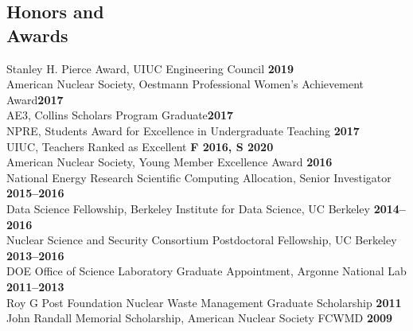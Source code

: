 \documentclass[margin,line]{resume}
\begin{document}
\begin{resume}
    \section{\mysidestyle Honors and\\Awards}
                Stanley H. Pierce Award, UIUC Engineering Council \hfill \textbf{2019}\vspace{.5mm}\\%
                American Nuclear Society, Oestmann Professional Women's Achievement Award\hfill \textbf{2017}\vspace{.5mm}\\%
                AE3, Collins Scholars Program Graduate\hfill \textbf{2017}\vspace{.5mm}\\%
                NPRE, Students Award for Excellence in Undergraduate Teaching \hfill \textbf{2017}\vspace{.5mm}\\%
                UIUC, Teachers Ranked as Excellent \hfill \textbf{F 2016, S 2020}\vspace{.5mm}\\%
                American Nuclear Society, Young Member Excellence Award                         \hfill \textbf{2016}\vspace{.5mm}\\%
                National Energy Research Scientific Computing Allocation, Senior Investigator     \hfill \textbf{2015--2016}\vspace{.5mm}\\%
                Data Science Fellowship, Berkeley Institute for Data Science, UC Berkeley     \hfill \textbf{2014--2016}\vspace{.5mm}\\%
                Nuclear Science and Security Consortium Postdoctoral Fellowship, UC Berkeley  \hfill \textbf{2013--2016}\vspace{.5mm}\\%
                DOE Office of Science Laboratory Graduate Appointment, Argonne National Lab   \hfill \textbf{2011--2013}\vspace{.5mm}\\%
                Roy G  Post Foundation Nuclear Waste Management Graduate Scholarship                \hfill \textbf{2011}\vspace{.5mm}\\%
                John Randall Memorial Scholarship, American Nuclear Society FCWMD                   \hfill \textbf{2009}\vspace{.5mm}\\%

\end{resume}
\end{document}
